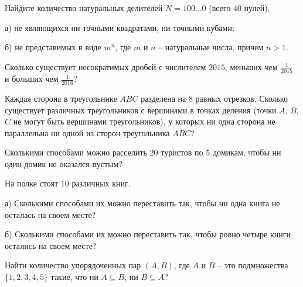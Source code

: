 \resetproblem \begingroup %
    \def\jeolmdate{9 ноября 2018}%
\jeolmheader \endgroup


\begin{problems}

\item Найдите количество натуральных делителей $N=100\ldots0$ (всего $40$ нулей), 

а) не являющихся ни точными квадратами, ни точными кубами;

б) не представимых в виде $m^n$, где $m$ и $n$ -- натуральные числа, причем $n>1$.

\item Сколько существует несократимых дробей с числителем $2015$, меньших чем $\frac{1}{2015}$ и больших чем $\frac{1}{2016}$?

\item Каждая сторона в треугольнике $ABC$ разделена на $8$ равных отрезков. Сколько существует различных треугольников с вершинами в точках деления (точки $A$, $B$, $C$ не могут быть вершинами треугольников), у которых ни одна сторона не параллельна ни одной из сторон треугольника $ABC$? 

\item Сколькими способами можно расселить $20$ туристов по $5$ домикам, чтобы ни один домик не оказался пустым?

\item На полке стоят $10$ различных книг. 

а) Сколькими способами их можно переставить так, чтобы ни одна книга не осталась на своем месте?

б) Сколькими способами их можно переставить так, чтобы ровно четыре книги остались на своем месте? 

\item Найти количество упорядоченных пар $(A,B)$, где $A$ и $B$ -- это подмножества $\{1,2,3,4,5\}$ такие, что ни $A \subseteq B$, ни $B \subseteq A$?


\end{problems}